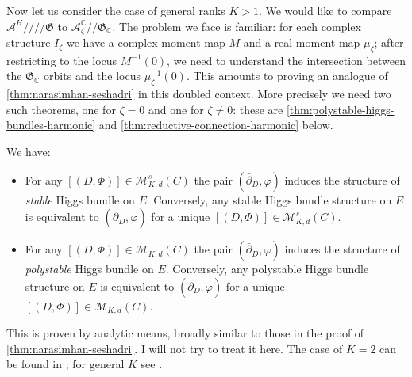 \documentclass[12pt,letterpaper,reqno]{article}
\numberwithin{equation}{section}
\newcommand{\fG}{{\mathfrak G}}
\newcommand{\cM}{\ensuremath{\mathcal M}}
\newcommand{\cA}{\ensuremath{\mathcal A}}
\newcommand{\C}{\ensuremath{\mathbb C}}
\newcommand{\kq}{/\!\!/}
\newcommand{\hkq}{/\!\!/\!\!/\!\!/}
\newcommand{\ti}[1]{\textit{#1}}
\begin{document}
Now let us consider the case of general ranks $K>1$. We would like
to compare $\cA^H \hkq \fG$ to $\cA_\zeta^\C \kq \fG_\C$.
The problem we face is familiar: for each complex structure $I_\zeta$
we have a complex moment map $M$ and a real moment map $\mu_\zeta$;
after restricting to the locus $M^{-1}(0)$,
we need to understand the intersection
between the $\fG_\C$ orbits and the locus $\mu_\zeta^{-1}(0)$.
This amounts to proving an analogue of \autoref{thm:narasimhan-seshadri}
in this doubled context. More precisely we need two such theorems,
one for $\zeta = 0$ and one for $\zeta \neq 0$:
these are \autoref{thm:polystable-higgs-bundles-harmonic}
and \autoref{thm:reductive-connection-harmonic} below.

\begin{thm} \label{thm:polystable-higgs-bundles-harmonic}
We have:
\begin{itemize}
\item For any $[(D,\Phi)] \in \cM^s_{K,d}(C)$ the pair
$(\bar\partial_D,\varphi)$
induces the structure of \ti{stable} Higgs bundle on $E$.
Conversely, any stable Higgs bundle structure
on $E$ is equivalent to $(\bar\partial_D,\varphi)$ for a unique $[(D,\Phi)] \in \cM^s_{K,d}(C)$.
\item For any $[(D,\Phi)] \in \cM_{K,d}(C)$ the pair
$(\bar\partial_D,\varphi)$
induces the structure of \ti{polystable} Higgs bundle on $E$.
Conversely, any polystable Higgs bundle structure
on $E$ is equivalent to $(\bar\partial_D,\varphi)$ for a unique $[(D,\Phi)] \in \cM_{K,d}(C)$.
\end{itemize}
\end{thm}

\begin{pf} This is proven by analytic means, broadly similar to those
 in the proof of \autoref{thm:narasimhan-seshadri}. I will not
 try to treat it here. The case of $K=2$
 can be found in \cite{MR89a:32021}; for general $K$ see \cite{MR944577}.
\end{pf}
\end{document}
